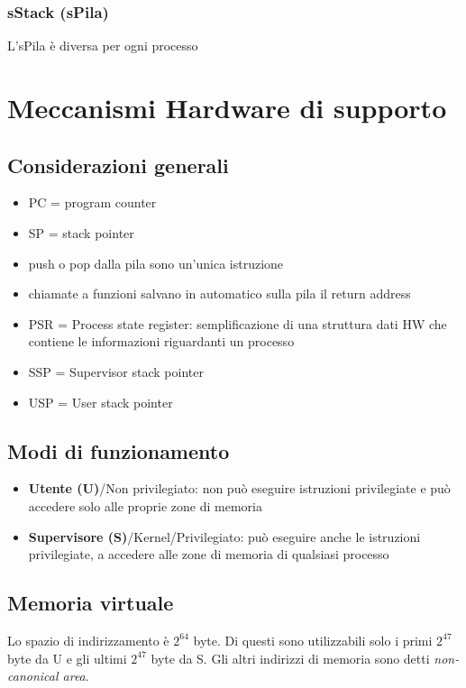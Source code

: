 \documentclass[12pt, a4paper]{report}
\begin{document}
\subsection{sStack (sPila)}
L'sPila è diversa per ogni processo

\chapter{Meccanismi Hardware di supporto}

\section{Considerazioni generali}
\begin{itemize}
	\item PC = program counter
	\item SP = stack pointer
	\item push o pop dalla pila sono un'unica istruzione
	\item chiamate a funzioni salvano in automatico sulla pila il return address
	\item PSR = Process state register: semplificazione di una struttura dati HW
	      che contiene le informazioni riguardanti un processo
	\item SSP = Supervisor stack pointer
	\item USP = User stack pointer
\end{itemize}

\section{Modi di funzionamento}
\begin{itemize}
	\item \textbf{Utente (U)}/Non privilegiato: non può eseguire istruzioni
	      privilegiate e può accedere solo alle proprie zone di memoria
	\item \textbf{Supervisore (S)}/Kernel/Privilegiato: può eseguire anche le
	      istruzioni privilegiate, a accedere alle zone di memoria di qualsiasi
	      processo
\end{itemize}
\section{Memoria virtuale}
Lo spazio di indirizzamento è $2^{64}$ byte. Di questi sono utilizzabili solo i
primi $2^{47}$ byte da U e gli ultimi $2^{47}$ byte da S. Gli altri indirizzi di
memoria sono detti \textit{non-canonical area}.
\end{document}

